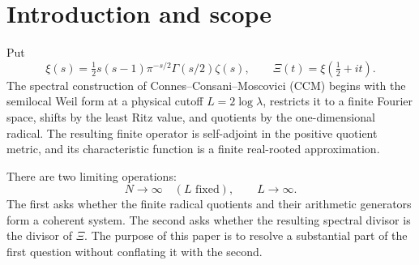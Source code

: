 \documentclass[11pt]{amsart}
\theoremstyle{definition}
\theoremstyle{remark}
\newcommand{\XiR}{\Xi}
\begin{document}
\begin{abstract}
This last equivalence is a normalized ground-state rewriting of Weil
positivity, not a proof or strengthening of it.  Analytic inequalities and
Wiener-space dynamics equivalent to RH were already developed by
Sun \cite{Sun}.  The finite-to-global construction developed on top of the CCM and
Suzuki frameworks therefore ends at two precisely separated tasks.  Full operator
convergence still requires the signed branch selector and the moving/model
identification.  A direct closure of RH requires the all-atom sharp
Doob--variance inequality above, equivalently the exclusion of spectrum
below \(1/2\) in the even mean-zero sector of the full Doob operator.  That
inequality is not proved here, and no conclusion about RH is claimed.
\end{abstract}

\maketitle
\tableofcontents

\section{Introduction and scope}

Put
\[
 \xi(s)=\tfrac12s(s-1)\pi^{-s/2}\Gamma(s/2)\zeta(s),
 \qquad \XiR(t)=\xi(\tfrac12+it).
\]
The spectral construction of Connes--Consani--Moscovici (CCM)
\cite{CCM} begins with the semilocal Weil form at a physical cutoff
\(L=2\log\lambda\), restricts it to a finite Fourier space, shifts by the
least Ritz value, and quotients by the one-dimensional radical.  The
resulting finite operator is self-adjoint in the positive quotient metric,
and its characteristic function is a finite real-rooted approximation.

There are two limiting operations:
\[
 N\longrightarrow\infty\quad(L\text{ fixed}),
 \qquad L\longrightarrow\infty.
\tag{1.1}
\]
The first asks whether the finite radical quotients and their arithmetic
generators form a coherent system.  The second asks whether the resulting
spectral divisor is the divisor of \(\XiR\).  The purpose of this paper is to
resolve a substantial part of the first question without conflating it with
the second.
\end{document}
